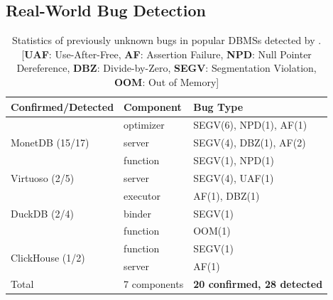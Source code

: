 \documentclass[sigconf,review,anonymous]{acmart}
\begin{document}
\subsection{Real-World Bug Detection}

\begin{table}[b]
\centering
\small
\caption{Statistics of previously unknown bugs in popular DBMSs detected by \tool{}. [\textbf{UAF}: Use-After-Free, \textbf{AF}: Assertion Failure, \textbf{NPD}: Null Pointer Dereference, \textbf{DBZ}: Divide-by-Zero, \textbf{SEGV}: Segmentation Violation, \textbf{OOM}: Out of Memory]}
\label{tab:real-world-bugs}
\setlength{\tabcolsep}{4pt}

\begin{tabularx}{\columnwidth}{l|l|X}
\toprule
\textbf{Confirmed/Detected} & \textbf{Component} & \textbf{Bug Type} \\
\midrule
\multirow{3}{*}{MonetDB (15/17)}
  & optimizer & SEGV(6), NPD(1), AF(1) \\
  & server    & SEGV(4), DBZ(1), AF(2) \\
  & function  & SEGV(1), NPD(1)        \\
\midrule
\multirow{1}{*}{Virtuoso (2/5)}
  & server    & SEGV(4), UAF(1)        \\
\midrule
\multirow{3}{*}{DuckDB (2/4)}
  & executor  & AF(1), DBZ(1)          \\
  & binder    & SEGV(1)                \\
  & function  & OOM(1)                 \\
\midrule
\multirow{2}{*}{ClickHouse (1/2)}
  & function  & SEGV(1)                \\
  & server    & AF(1)                  \\
\midrule
Total & 7 components & \textbf{20 confirmed, 28 detected} \\
\bottomrule
\end{tabularx}
\end{table}
\end{document}
